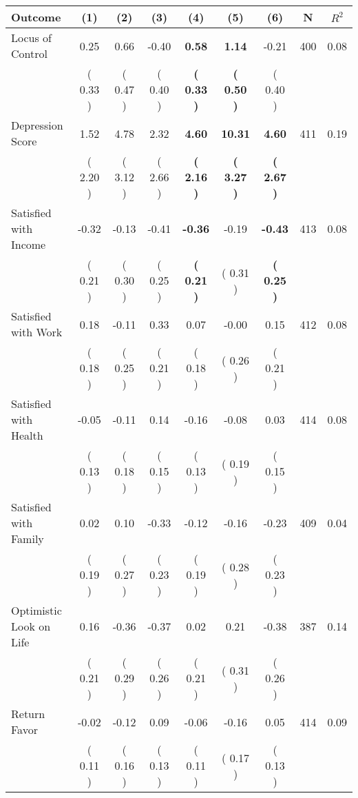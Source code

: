 \begin{tabular}{lcccccccc}
\toprule
 \textbf{Outcome} & \textbf{(1)} & \textbf{(2)} & \textbf{(3)} & \textbf{(4)} & \textbf{(5)} & \textbf{(6)} & \textbf{N} & \textbf{$ R^2$} \\
\midrule
Locus of Control &      0.25 &      0.66 &     -0.40 & \textbf{     0.58} & \textbf{     1.14} &     -0.21 & 400 &       0.08 \\ 
 & (     0.33 ) & (     0.47 ) & (     0.40 ) & \textbf{(     0.33 )} & \textbf{(     0.50 )} & (     0.40 ) & \\
Depression Score &      1.52 &      4.78 &      2.32 & \textbf{     4.60} & \textbf{    10.31} & \textbf{     4.60} & 411 &       0.19 \\ 
 & (     2.20 ) & (     3.12 ) & (     2.66 ) & \textbf{(     2.16 )} & \textbf{(     3.27 )} & \textbf{(     2.67 )} & \\
Satisfied with Income &     -0.32 &     -0.13 &     -0.41 & \textbf{    -0.36} &     -0.19 & \textbf{    -0.43} & 413 &       0.08 \\ 
 & (     0.21 ) & (     0.30 ) & (     0.25 ) & \textbf{(     0.21 )} & (     0.31 ) & \textbf{(     0.25 )} & \\
Satisfied with Work &      0.18 &     -0.11 &      0.33 &      0.07 &     -0.00 &      0.15 & 412 &       0.08 \\ 
 & (     0.18 ) & (     0.25 ) & (     0.21 ) & (     0.18 ) & (     0.26 ) & (     0.21 ) & \\
Satisfied with Health &     -0.05 &     -0.11 &      0.14 &     -0.16 &     -0.08 &      0.03 & 414 &       0.08 \\ 
 & (     0.13 ) & (     0.18 ) & (     0.15 ) & (     0.13 ) & (     0.19 ) & (     0.15 ) & \\
Satisfied with Family &      0.02 &      0.10 &     -0.33 &     -0.12 &     -0.16 &     -0.23 & 409 &       0.04 \\ 
 & (     0.19 ) & (     0.27 ) & (     0.23 ) & (     0.19 ) & (     0.28 ) & (     0.23 ) & \\
Optimistic Look on Life &      0.16 &     -0.36 &     -0.37 &      0.02 &      0.21 &     -0.38 & 387 &       0.14 \\ 
 & (     0.21 ) & (     0.29 ) & (     0.26 ) & (     0.21 ) & (     0.31 ) & (     0.26 ) & \\
Return Favor &     -0.02 &     -0.12 &      0.09 &     -0.06 &     -0.16 &      0.05 & 414 &       0.09 \\ 
 & (     0.11 ) & (     0.16 ) & (     0.13 ) & (     0.11 ) & (     0.17 ) & (     0.13 ) & \\

\end{tabular}
